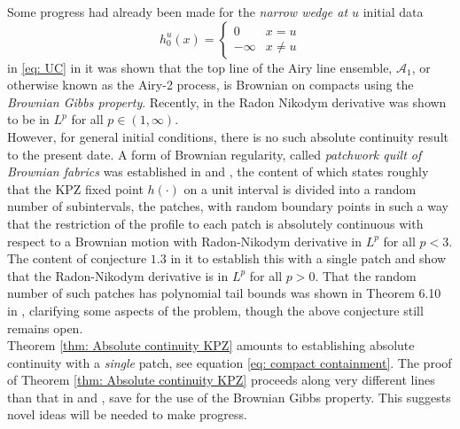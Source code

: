 \documentclass[12pt]{report}
\theoremstyle{plain}
\begin{document}
Some progress had already been made for the \textit{narrow wedge at $u$} initial data \[
h_0^u(x) = \begin{cases}
    0 & x = u\\
    -\infty & x\neq u
\end{cases}
\]
in \ref{eq: UC} in \cite{corwin2014brownian} it was shown that the top line of the Airy line ensemble, $\mathcal{A}_1$, or otherwise known as the Airy-2 process, is Brownian on compacts using the \textit{Brownian Gibbs property}. Recently, in \cite{calvert2019brownian} the Radon Nikodym derivative was shown to be in $L^p$ for all $p\in (1,\infty)$.\\

However, for general initial conditions, there is no such absolute continuity result to the present date. A form of Brownian regularity, called \textit{patchwork quilt of Brownian fabrics} was established in \cite{hammond2019patchwork} and \cite{calvert2019brownian}, the content of which states roughly that the KPZ fixed point $h(\cdot)$ on a unit interval is divided into a random number of subintervals, the patches, with random boundary points in such a way that the restriction of the profile to each patch is absolutely continuous with respect to a Brownian motion with Radon-Nikodym derivative in $L^p$ for all $p<3$. The content of conjecture $1.3$ in \cite{hammond2019patchwork} it to establish this with a single patch and show that the Radon-Nikodym derivative is in $L^p$ for all $p>0$. That the random number of such patches has polynomial tail bounds was shown in Theorem 6.10 in \cite{calvert2019brownian}, clarifying some aspects of the problem, though the above conjecture still remains open.\\

Theorem \ref{thm: Absolute continuity KPZ} amounts to establishing absolute continuity with a \textit{single} patch, see equation \ref{eq: compact containment}. The proof of Theorem \ref{thm: Absolute continuity KPZ} proceeds along very different lines than that in \cite{hammond2019patchwork} and \cite{calvert2019brownian}, save for the use of the Brownian Gibbs property. This suggests novel ideas will be needed to make progress.\\
\end{document}
